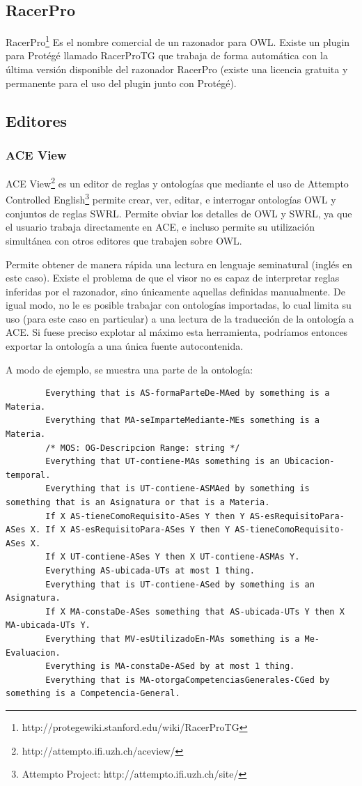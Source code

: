 \subsection{RacerPro} RacerPro\footnote{http://protegewiki.stanford.edu/wiki/RacerProTG} Es el nombre comercial de un razonador para OWL. Existe un plugin para Protégé llamado RacerProTG que trabaja de forma automática con la última versión disponible del razonador RacerPro (existe una licencia gratuita y permanente para el uso del plugin junto con Protégé). 



\subsection{Editores}

\subsubsection{ACE View} ACE View\footnote{http://attempto.ifi.uzh.ch/aceview/} es un editor de reglas y ontologías que mediante el uso de Attempto Controlled English\footnote{Attempto Project: http://attempto.ifi.uzh.ch/site/} permite crear, ver, editar, e interrogar ontologías OWL y conjuntos de reglas SWRL. Permite obviar los detalles de OWL y SWRL, ya que el usuario trabaja directamente en ACE, e incluso permite su utilización simultánea con otros editores que trabajen sobre OWL.

Permite obtener de manera rápida una lectura en lenguaje seminatural (inglés en este caso). Existe el problema de que el visor no es capaz de interpretar reglas inferidas por el razonador, sino únicamente aquellas definidas manualmente. De igual modo, no le es posible trabajar con ontologías importadas, lo cual limita su uso (para este caso en particular) a una lectura de la traducción de la ontología a ACE. Si fuese preciso explotar al máximo esta herramienta, podríamos entonces exportar la ontología a una única fuente autocontenida.

A modo de ejemplo, se muestra una parte de la ontología:

{\ttfamily\footnotesize
\begin{verbatim}
		Everything that is AS-formaParteDe-MAed by something is a Materia.
		Everything that MA-seImparteMediante-MEs something is a Materia.
		/* MOS: OG-Descripcion Range: string */
		Everything that UT-contiene-MAs something is an Ubicacion-temporal.
		Everything that is UT-contiene-ASMAed by something is something that is an Asignatura or that is a Materia.
		If X AS-tieneComoRequisito-ASes Y then Y AS-esRequisitoPara-ASes X. If X AS-esRequisitoPara-ASes Y then Y AS-tieneComoRequisito-ASes X.
		If X UT-contiene-ASes Y then X UT-contiene-ASMAs Y.
		Everything AS-ubicada-UTs at most 1 thing.
		Everything that is UT-contiene-ASed by something is an Asignatura.
		If X MA-constaDe-ASes something that AS-ubicada-UTs Y then X MA-ubicada-UTs Y.
		Everything that MV-esUtilizadoEn-MAs something is a Me-Evaluacion.
		Everything is MA-constaDe-ASed by at most 1 thing.
		Everything that is MA-otorgaCompetenciasGenerales-CGed by something is a Competencia-General.
\end{verbatim}
}

